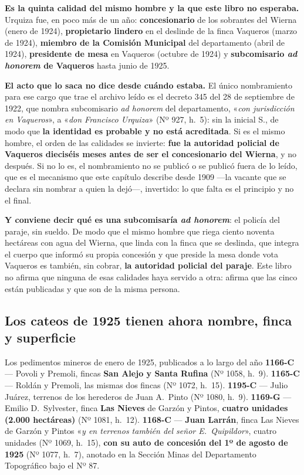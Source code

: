 \begin{cautela}
\textbf{Es la quinta calidad del mismo hombre y la que este libro no esperaba.} Urquiza fue, en
poco más de un año: \textbf{concesionario} de los sobrantes del Wierna (enero de 1924),
\textbf{propietario lindero} en el deslinde de la finca Vaqueros (marzo de 1924), \textbf{miembro
de la Comisión Municipal} del departamento (abril de 1924), \textbf{presidente de mesa} en
Vaqueros (octubre de 1924) y \textbf{subcomisario \textit{ad honorem} de Vaqueros} hasta junio de
1925.

\textbf{El acto que lo saca no dice desde cuándo estaba.} El único nombramiento para ese cargo
que trae el archivo leído es el decreto 345 del 28 de septiembre de 1922, que nombra subcomisario
\textit{ad honorem} del departamento, «\textit{con jurisdicción en Vaqueros}», a «\textit{don
Francisco Urquiza}» (Nº 927, h.\ 5): sin la inicial S., de modo que \textbf{la identidad es
probable y no está acreditada}. Si es el mismo hombre, el orden de las calidades se invierte:
\textbf{fue la autoridad policial de Vaqueros dieciséis meses antes de ser el concesionario del
Wierna}, y no después. Si no lo es, el nombramiento no se publicó o se publicó fuera de lo leído,
que es el mecanismo que este capítulo describe desde 1909 ---la vacante que se declara sin nombrar
a quien la dejó---, invertido: lo que falta es el principio y no el final.

\textbf{Y conviene decir qué es una subcomisaría \textit{ad honorem}}: el policía del paraje, sin
sueldo. De modo que el mismo hombre que riega ciento noventa hectáreas con agua del Wierna, que
linda con la finca que se deslinda, que integra el cuerpo que informó su propia concesión y que
preside la mesa donde vota Vaqueros es también, sin cobrar, \textbf{la autoridad policial del
paraje}. Este libro no afirma que ninguna de esas calidades haya servido a otra: afirma que las
cinco están publicadas y que son de la misma persona.
\end{cautela}

\subsection*{Los cateos de 1925 tienen ahora nombre, finca y superficie}

\begin{ficha}{Los pedimentos mineros de enero de 1925, publicados a lo largo del año}
\textbf{1166-C} --- Povoli y Premoli, fincas \textbf{San Alejo y Santa Rufina} (Nº 1058, h.\ 9).
\textbf{1165-C} --- Roldán y Premoli, las mismas dos fincas (Nº 1072, h.\ 15).
\textbf{1195-C} --- Julio Juárez, terrenos de los herederos de Juan A.\ Pinto (Nº 1080, h.\ 9).
\textbf{1169-G} --- Emilio D.\ Sylvester, finca \textbf{Las Nieves} de Garzón y Pintos,
\textbf{cuatro unidades (2.000 hectáreas)} (Nº 1081, h.\ 12).
\textbf{1168-C} --- \textbf{Juan Larrán}, finca Las Nieves de Garzón y Pintos «\textit{y en
terrenos también del señor E.\ Quipildor}», cuatro unidades (Nº 1069, h.\ 15), \textbf{con su auto
de concesión del 1º de agosto de 1925} (Nº 1077, h.\ 7), anotado en la Sección Minas del
Departamento Topográfico bajo el Nº 87.
\end{ficha}

